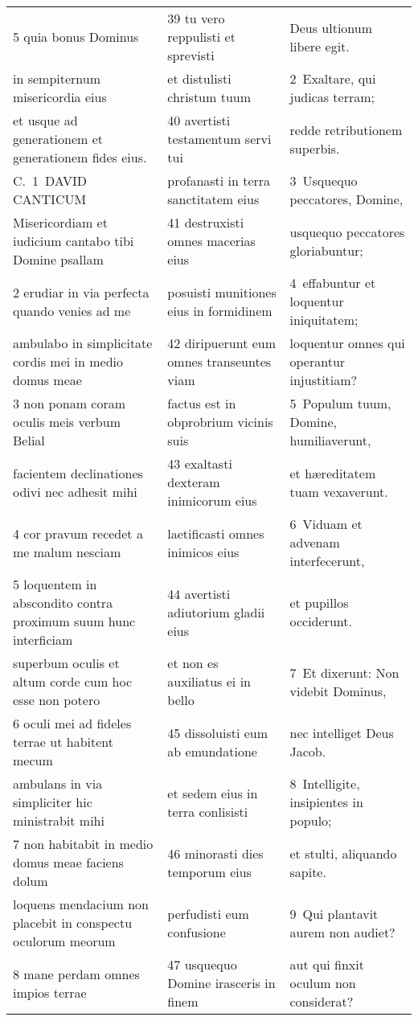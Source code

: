 \documentclass{article}
\begin{document}
\begin{longtable}{@{}p{}p{}p{}@{}}
5 quia bonus Dominus	&	39 tu vero reppulisti et sprevisti	&	Deus ultionum libere egit.	\\
in sempiternum misericordia eius	&	et distulisti christum tuum	&	2 Exaltare, qui judicas terram;	\\
et usque ad generationem et generationem fides eius.	&	40 avertisti testamentum servi tui	&	redde retributionem superbis.	\\
C. 1 DAVID CANTICUM	&	profanasti in terra sanctitatem eius	&	3 Usquequo peccatores, Domine,	\\
Misericordiam et iudicium cantabo tibi Domine psallam	&	41 destruxisti omnes macerias eius	&	usquequo peccatores gloriabuntur;	\\
2 erudiar in via perfecta quando venies ad me	&	posuisti munitiones eius in formidinem	&	4 effabuntur et loquentur iniquitatem;	\\
ambulabo in simplicitate cordis mei in medio domus meae	&	42 diripuerunt eum omnes transeuntes viam	&	loquentur omnes qui operantur injustitiam?	\\
3 non ponam coram oculis meis verbum Belial	&	factus est in obprobrium vicinis suis	&	5 Populum tuum, Domine, humiliaverunt,	\\
facientem declinationes odivi nec adhesit mihi	&	43 exaltasti dexteram inimicorum eius	&	et hæreditatem tuam vexaverunt.	\\
4 cor pravum recedet a me malum nesciam	&	laetificasti omnes inimicos eius	&	6 Viduam et advenam interfecerunt,	\\
5 loquentem in abscondito contra proximum suum hunc interficiam	&	44 avertisti adiutorium gladii eius	&	et pupillos occiderunt.	\\
superbum oculis et altum corde cum hoc esse non potero	&	et non es auxiliatus ei in bello	&	7 Et dixerunt: Non videbit Dominus,	\\
6 oculi mei ad fideles terrae ut habitent mecum	&	45 dissoluisti eum ab emundatione	&	nec intelliget Deus Jacob.	\\
ambulans in via simpliciter hic ministrabit mihi	&	et sedem eius in terra conlisisti	&	8 Intelligite, insipientes in populo;	\\
7 non habitabit in medio domus meae faciens dolum	&	46 minorasti dies temporum eius	&	et stulti, aliquando sapite.	\\
loquens mendacium non placebit in conspectu oculorum meorum	&	perfudisti eum confusione	&	9 Qui plantavit aurem non audiet?	\\
8 mane perdam omnes impios terrae	&	47 usquequo Domine irasceris in finem	&	aut qui finxit oculum non considerat?	\\

\end{longtable}
\end{document}
